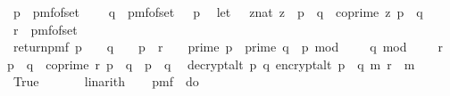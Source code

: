 \begin{isabellebody}
\ \ p\ {\isasymleftarrow}\ pmf{\isacharunderscore}{\kern0pt}of{\isacharunderscore}{\kern0pt}set\ {\isasymK}{\isacharsemicolon}{\kern0pt}\ \isanewline
\ \ q\ {\isasymleftarrow}\ pmf{\isacharunderscore}{\kern0pt}of{\isacharunderscore}{\kern0pt}set\ {\isacharparenleft}{\kern0pt}{\isasymK}\ {\isacharminus}{\kern0pt}\ {\isacharbraceleft}{\kern0pt}p{\isacharbraceright}{\kern0pt}{\isacharparenright}{\kern0pt}{\isacharsemicolon}{\kern0pt}\isanewline
\ \ let\ {\isasymZ}\ {\isacharequal}{\kern0pt}\ {\isacharbraceleft}{\kern0pt}{\isacharparenleft}{\kern0pt}z{\isacharcolon}{\kern0pt}{\isacharcolon}{\kern0pt}nat{\isacharparenright}{\kern0pt}{\isachardot}{\kern0pt}\ z\ {\isacharless}{\kern0pt}\ p\ {\isacharasterisk}{\kern0pt}\ q\ {\isasymand}\ coprime\ z\ {\isacharparenleft}{\kern0pt}p\ {\isacharasterisk}{\kern0pt}\ q{\isacharparenright}{\kern0pt}{\isacharbraceright}{\kern0pt}{\isacharsemicolon}{\kern0pt}\isanewline
\ \ r\ {\isasymleftarrow}\ pmf{\isacharunderscore}{\kern0pt}of{\isacharunderscore}{\kern0pt}set\ {\isasymZ}{\isacharsemicolon}{\kern0pt}\isanewline
\ \ return{\isacharunderscore}{\kern0pt}pmf\ {\isacharparenleft}{\kern0pt}{\isacharparenleft}{\kern0pt}{\isacharparenleft}{\kern0pt}p\ {\isasymin}\ {\isasymK}\ {\isasymand}\ q\ {\isasymin}\ {\isasymK}\ {\isacharminus}{\kern0pt}\ {\isacharbraceleft}{\kern0pt}p{\isacharbraceright}{\kern0pt}\ {\isasymand}\ r\ {\isasymin}\ {\isasymZ}{\isacharparenright}{\kern0pt}\ {\isasymor}\ {\isacharparenleft}{\kern0pt}prime\ p\ {\isasymand}\ prime\ q\ {\isasymand}\ p\ mod\ {}\ {\isacharequal}{\kern0pt}\ {}\ {\isasymand}\ q\ mod\ {}\ {\isacharequal}{\kern0pt}\ {}\ {\isasymand}\ r\ {\isacharless}{\kern0pt}\ p\ {\isacharasterisk}{\kern0pt}\ q\ {\isasymand}\ coprime\ r\ {\isacharparenleft}{\kern0pt}p\ {\isacharasterisk}{\kern0pt}\ q{\isacharparenright}{\kern0pt}\ {\isasymand}\ p\ {\isasymnoteq}\ q{\isacharparenright}{\kern0pt}{\isacharparenright}{\kern0pt}\isanewline
\ {\isasymor}\ decrypt{\isacharunderscore}{\kern0pt}alt\ p\ q\ {\isacharparenleft}{\kern0pt}encrypt{\isacharunderscore}{\kern0pt}alt\ {\isacharparenleft}{\kern0pt}p\ {\isacharasterisk}{\kern0pt}\ q{\isacharparenright}{\kern0pt}\ m\ r{\isacharparenright}{\kern0pt}\ {\isacharequal}{\kern0pt}\ m{\isacharparenright}{\kern0pt}{\isacharbraceright}{\kern0pt}{\isacharparenright}{\kern0pt}\isanewline
\ \ True{\isachardoublequoteclose}\ \isanewline
\ \ \ \ \isamarkupfalse%
\ linarith\isanewline
\isanewline
\ \ \isamarkupfalse%
\ {\isacharquery}{\kern0pt}pmf\ {\isacharequal}{\kern0pt}\ {\isachardoublequoteopen}{\isacharparenleft}{\kern0pt}do\ {\isacharbraceleft}{\kern0pt}\isanewline

\end{isabellebody}
